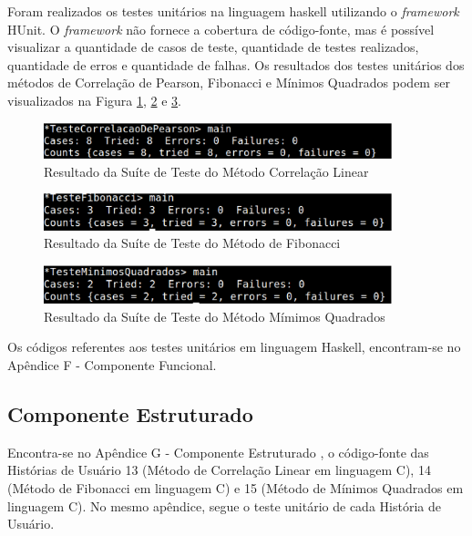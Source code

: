 Foram realizados os testes unitários na linguagem haskell utilizando o \textit{framework} HUnit. O \textit{framework} não fornece a cobertura de código-fonte, mas é possível visualizar a quantidade de casos de teste, quantidade de testes realizados, quantidade de erros e quantidade de falhas. Os resultados dos testes unitários dos métodos de Correlação de Pearson, Fibonacci e Mínimos Quadrados podem ser visualizados na Figura \ref{testeCorrelacaoHaskell}, \ref{testeFibonacciHaskell} e \ref{TesteMinimosHaskell}.

\begin{figure}[H]
\centering
\includegraphics[width=0.9\textwidth]{figuras/testeCorrelacaoHaskell}
\caption{Resultado da Suíte de Teste do Método Correlação Linear}
\label{testeCorrelacaoHaskell}
\end{figure}

\begin{figure}[H]
\centering
\includegraphics[width=0.9\textwidth]{figuras/testeFibonacciHaskell}
\caption{Resultado da Suíte de Teste do Método de Fibonacci}
\label{testeFibonacciHaskell}
\end{figure}

\begin{figure}[H]
\centering
\includegraphics[width=0.9\textwidth]{figuras/TesteMinimosHaskell}
\caption{Resultado da Suíte de Teste do Método Mímimos Quadrados}
\label{TesteMinimosHaskell}
\end{figure}

Os códigos referentes aos testes unitários em linguagem Haskell, encontram-se no Apêndice F - Componente Funcional.

\subsection{Componente Estruturado}
Encontra-se no Apêndice G - Componente Estruturado , o código-fonte das Histórias de Usuário 13 (Método de Correlação Linear em linguagem C), 14 (Método de Fibonacci em linguagem C) e 15 (Método de Mínimos Quadrados em linguagem C). No mesmo apêndice, segue o teste
unitário de cada História de Usuário.

